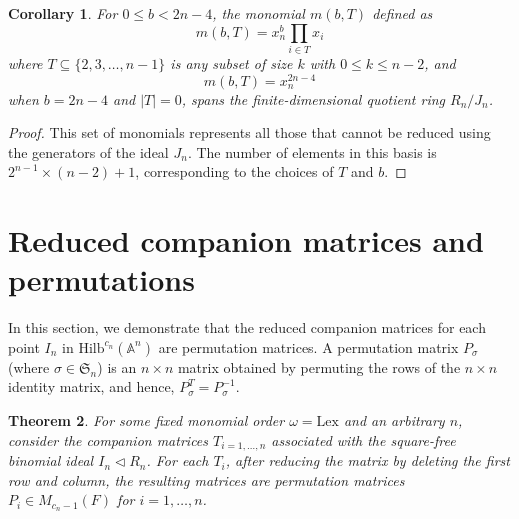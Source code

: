 \documentclass[11pt]{amsart}
\theoremstyle{plain}
\newtheorem{theorem}{Theorem}[section]
\newtheorem{corollary}[theorem]{Corollary}
\theoremstyle{definition}
\theoremstyle{remark}
\begin{document}
\allowdisplaybreaks

\begin{corollary}\label{cor:monomial-basis} 
	For \(0 \leq b < 2n-4 \), the monomial \(m(b, T)\) defined as \[m(b,T)=x_n^{b}\prod_{i\in T}x_i \] where \(T\subseteq \{2,3,\dots,n-1\} \) is any subset of size \(k\) with \( 0\leq k \leq n-2 \), and \[ m(b,T)=x_n^{2n-4} \] when \(b=2n-4\) and \(|T|=0\), spans the finite-dimensional quotient ring \(R_n/J_n\).
\end{corollary}
\begin{proof}
	This set of monomials represents all those that cannot be reduced using the generators of the ideal \(J_n\). The number of elements in this basis is \(2^{n-1}\times (n-2)+1 \), corresponding to the choices of \(T\) and \(b\).
\end{proof}

\section{Reduced companion matrices and permutations}
\label{sec:companion}

In this section, we demonstrate that the reduced companion matrices for each point $I_n$ in $\mbox{Hilb}^{c_n}(\mathbb{A}^n)$ are permutation matrices. A permutation matrix $P_{\sigma}$ (where $\sigma \in \mathfrak{S}_n$) is an $n\times n$ matrix obtained by permuting the rows of the $n\times n$ identity matrix, and hence, $P_{\sigma}^T=P_{\sigma}^{-1}$.

\begin{theorem}\label{lem:reduced-companion}
	For some fixed monomial order \( \omega = \mbox{Lex}\) and an arbitrary \(n\), consider the companion matrices $T_{i= 1,\dots, n}$ associated with the square-free binomial ideal $I_n \lhd R_n$. For each \(T_i\), after reducing the matrix by deleting the first row and column, the resulting matrices are permutation matrices \(P_i \in M_{c_n-1}(F) \) for \(i=1, \dots, n\).
\end{theorem}
\end{document}
